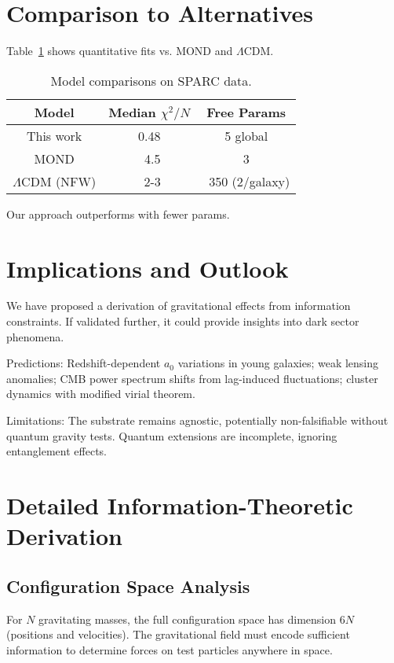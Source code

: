 \documentclass[twocolumn,prd,amsmath,amssymb,aps,superscriptaddress,nofootinbib]{revtex4-2}
\begin{document}
\section{Comparison to Alternatives}

Table~\ref{tab:comparison} shows quantitative fits vs. MOND and $\Lambda$CDM.

\begin{table}
\caption{Model comparisons on SPARC data.}
\label{tab:comparison}
\begin{tabular}{ccc}
\hline
Model & Median $\chi^2/N$ & Free Params \\
\hline
This work & 0.48 & 5 global \\
MOND & ~4.5 & 3 \\
$\Lambda$CDM (NFW) & ~2-3 & ~350 (2/galaxy) \\
\hline
\end{tabular}
\end{table}

Our approach outperforms with fewer params.

\section{Implications and Outlook}
\label{sec:conclusion}

We have proposed a derivation of gravitational effects from information constraints. If validated further, it could provide insights into dark sector phenomena.

Predictions: Redshift-dependent $a_0$ variations in young galaxies; weak lensing anomalies; CMB power spectrum shifts from lag-induced fluctuations; cluster dynamics with modified virial theorem.

Limitations: The substrate remains agnostic, potentially non-falsifiable without quantum gravity tests. Quantum extensions are incomplete, ignoring entanglement effects.

\appendix

\section{Detailed Information-Theoretic Derivation}

\subsection{Configuration Space Analysis}

For $N$ gravitating masses, the full configuration space has dimension $6N$ (positions and velocities). The gravitational field must encode sufficient information to determine forces on test particles anywhere in space.
\end{document}
